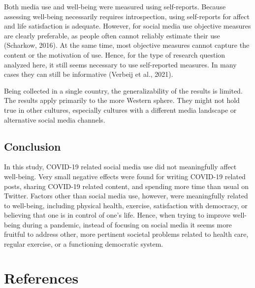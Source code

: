 \documentclass[
  man,mask,floatsintext]{apa7}
\begin{document}
Both media use and well-being were measured using self-reports.
Because assessing well-being necessarily requires introspection, using self-reports for affect and life satisfaction is adequate.
However, for social media use objective measures are clearly preferable, as people often cannot reliably estimate their use (Scharkow, 2016).
At the same time, most objective measures cannot capture the content or the motivation of use.
Hence, for the type of research question analyzed here, it still seems necessary to use self-reported measures.
In many cases they can still be informative (Verbeij et al., 2021).

Being collected in a single country, the generalizability of the results is limited.
The results apply primarily to the more Western sphere.
They might not hold true in other cultures, especially cultures with a different media landscape or alternative social media channels.

\hypertarget{conclusion}{%
\subsection{Conclusion}\label{conclusion}}

In this study, COVID-19 related social media use did not meaningfully affect well-being.
Very small negative effects were found for writing COVID-19 related posts, sharing COVID-19 related content, and spending more time than usual on Twitter.
Factors other than social media use, however, were meaningfully related to well-being, including physical health, exercise, satisfaction with democracy, or believing that one is in control of one's life.
Hence, when trying to improve well-being during a pandemic, instead of focusing on social media it seems more fruitful to address other, more pertinent societal problems related to health care, regular exercise, or a functioning democratic system.

\newpage

\hypertarget{references}{%
\section{References}\label{references}}
\end{document}
